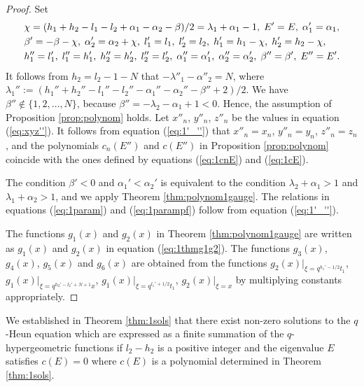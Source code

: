 \documentclass[12pt]{amsart}
\numberwithin{equation}{section}
\theoremstyle{definition}
\theoremstyle{remark}
\begin{document}
\begin{proof}
Set
\begin{align}
    &\chi = (h_{1} + h_{2} - l_{1} - l_{2} + \alpha_{1} - \alpha_{2} - \beta )/2  = \lambda _{1} + \alpha _{1} - 1 , \; E' = E, \;  \alpha '_{1} = \alpha _{1}, \label{eq:1'_''} \\
    & \beta ' = -\beta - \chi, \; \alpha '_{2} = \alpha_{2} + \chi, \;  l'_{1} = l_{1}, \;  l'_{2} = l_{2}, \; h'_1 = h_1 - \chi, \; h'_2 = h_2 - \chi, \notag \\
& h''_{1} = l' _1, \;  l''_{1} = h' _1, \; h''_{2} = h' _2, \; l''_{2} = l' _2, \; \alpha ''_{1} = \alpha '_{1} , \; \alpha ''_{2} = \alpha '_{2} , \; \beta '' = \beta ' , \;  E''=E'. \notag 
 \end{align}
It follows from $h_{2} = l_{2} - 1 - N$ that $-\lambda ''_1 - \alpha '' _2 = N$, where $\lambda_{1}'' := (h_{1}'' + h_{2}'' - l_{1}'' - l_{2}'' - \alpha_{1}'' - \alpha_{2}'' - \beta'' + 2)/2$.
We have $\beta '' \not \in \{ 1,2,\dots ,N\}$, because $\beta '' = - \lambda _{2} - \alpha _{1} + 1<0$. 
Hence, the assumption of Proposition \ref{prop:polynom} holds.
Let $x''_n$, $y''_n $, $z''_n $ be the values in equation (\ref{eq:xyz''}).
It follows from equation (\ref{eq:1'_''}) that $x''_n= x_n$, $y''_n= y_n$, $z''_n= z_n$, and the polynomials  $c_{n} (E'')$ and $c (E'')$ in Proposition \ref{prop:polynom} coincide with the ones defined by equations (\ref{eq:1cnE}) and (\ref{eq:1cE}).

The condition $\beta' < 0 $ and $\alpha_{1}' < \alpha_{2}'$ is equivalent to the condition $\lambda _{2} + \alpha _{1} >1 $ and  $ \lambda _{1} + \alpha _{2}  > 1$, and we apply Theorem \ref{thm:polynom1gauge}.
The relations in equations (\ref{eq:1param}) and (\ref{eq:1parampf}) follow from equation (\ref{eq:1'_''}).

The functions $g_1(x)$ and $g_2(x)$ in Theorem \ref{thm:polynom1gauge} are written as $g_1(x)$ and $g_2(x)$ in equation (\ref{eq:1thmg1g2}).
The functions $g_3(x)$, $g_4(x)$, $g_5(x)$ and $g_6(x)$ are obtained from the functions $g_{2}(x) | _{\xi = q^{h_{1}' - 1/2}t_{1} }$, $ g_1 (x) | _{\xi = q^{h_{2}' - l_{2}' + N + 1}x }$, $g_1 (x) | _{\xi = q^{l_{1}' + 1/2}t_{1} }$, $ g_{2}(x) | _{\xi = x } $ by multiplying constants appropriately.
\end{proof}
We established in Theorem \ref{thm:1sols} that there exist non-zero solutions to the $q$-Heun equation which are expressed as a finite summation of the $q$-hypergeometric functions if $l_{2} - h_{2}$ is a positive integer and the eigenvalue $E$ satisfies $c(E)=0$ where $c(E)$ is a polynomial determined in Theorem \ref{thm:1sols}.
\end{document}
